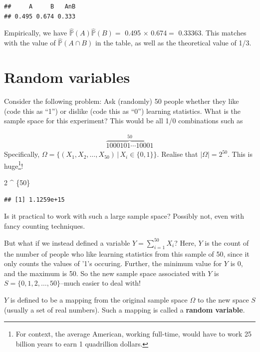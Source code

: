 \documentclass[
]{book}
\newenvironment{Shaded}{\begin{snugshade}}{\end{snugshade}}
\newcommand{\DecValTok}[1]{\textcolor[rgb]{0.00,0.00,0.81}{#1}}
\newcommand{\NormalTok}[1]{#1}
\newcommand{\SpecialCharTok}[1]{\textcolor[rgb]{0.00,0.00,0.00}{#1}}
\newcommand{\bbP}{\mathbb{P}}
\theoremstyle{definition}
\theoremstyle{definition}
\theoremstyle{definition}
\theoremstyle{definition}
\theoremstyle{remark}
\begin{document}
\begin{verbatim}
##     A     B   AnB 
## 0.495 0.674 0.333
\end{verbatim}

Empirically, we have \(\hat{\bbP}(A)\hat{\bbP}(B) =\) 0.495 \(\times\) 0.674\(=\) 0.33363.
This matches with the value of \(\hat{\bbP}(A \cap B)\) in the table, as well as the theoretical value of 1/3.

\hypertarget{random-variables}{%
\section{Random variables}\label{random-variables}}

Consider the following problem:
Ask (randomly) 50 people whether they like (code this as ``1'') or dislike (code this as ``0'') learning statistics.
What is the sample space for this experiment?
This would be all 1/0 combinations such as

\begin{align*}
\overbrace{1000101\cdots 10001}^{50}
\end{align*}
Specifically, \(\Omega = \big\{(X_1,X_2,\dots,X_{50}) \,|\, X_i \in \{0,1\} \big\}\). Realise that \(|\Omega| = 2^{50}\). This is huge\footnote{For context, the average American, working full-time, would have to work 25 billion years to earn 1 quadrillion dollars.}!

\begin{Shaded}
\begin{Highlighting}[]
\DecValTok{2} \SpecialCharTok{\^{}}\NormalTok{ \{}\DecValTok{50}\NormalTok{\}}
\end{Highlighting}
\end{Shaded}

\begin{verbatim}
## [1] 1.1259e+15
\end{verbatim}

Is it practical to work with such a large sample space?
Possibly not, even with fancy counting techniques.

But what if we instead defined a variable \(Y = \sum_{i=1}^{50} X_i\)?
Here, \(Y\) is the count of the number of people who like learning statistics from this sample of 50, since it only counts the values of '1's occuring.
Further, the minimum value for \(Y\) is 0, and the maximum is 50.
So the new sample space associated with \(Y\) is \(S=\{0,1,2,\dots,50\}\)--much easier to deal with!

\(Y\) is defined to be a mapping from the original sample space \(\Omega\) to the new space \(S\) (usually a set of real numbers).
Such a mapping is called a \textbf{random variable}.
\end{document}
